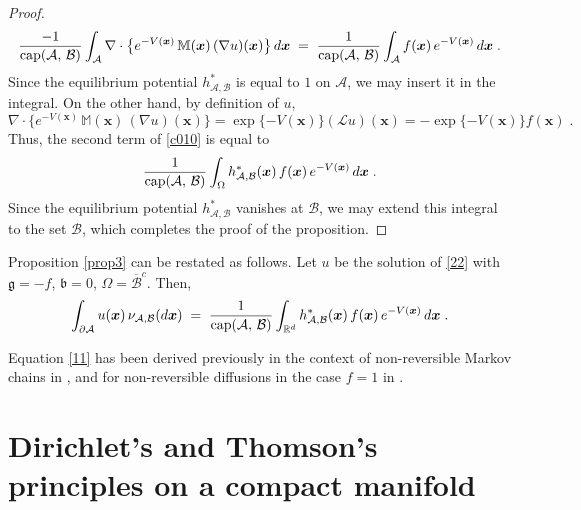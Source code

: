 \documentclass[reqno]{amsart}
\newcounter{as}[section]
\newcommand{\mc}[1]{{\mathcal #1}}
\newcommand{\mf}[1]{{\mathfrak #1}}
\newcommand{\bb}[1]{{\mathbb #1}}
\newcommand{\bs}[1]{{\boldsymbol #1}}
\newcommand{\<}{\langle}
\renewcommand{\>}{\rangle}
\renewcommand{\Cap}{{\rm cap}}
\begin{document}
\begin{proof}
\begin{equation*}
\frac {-1} {\Cap (\mc A,\,\mc B)} \int_{\mc A}
\nabla \cdot \big\{ e^{-V(\bs{x})} \, \bb M(\bs{x}) \, (\nabla u)(\bs{x}) \big\} \,
d\bs{x} \;=\; \frac {1} {\Cap (\mc A,\,\mc B)} \int_{\mc A} f(\bs{x}) \, e^{-V(\bs{x})}\, d\bs{x} \;.
\end{equation*}
Since the equilibrium potential $h^*_{\mc A,\mc B}$ is equal to $1$ on $\mc A$, we
may insert it in the integral.
On the other hand, by definition of $u$,
$$\nabla \cdot \{ e^{-V(\bs{x})} \,
\bb M(\bs{x}) \, (\nabla u)(\bs{x}) \} = \exp\{-V(\bs{x})\} (\mathcal L u)(\bs{x}) = -
\exp\{-V(\bs{x})\} f(\bs{x})\;.$$
Thus, the second term of \eqref{c010} is equal to
\begin{equation*}
\frac {1} {\Cap (\mc A,\,\mc B)} \int_{\Omega} h^*_{\mc A,\mc B} (\bs{x}) \, f(\bs{x}) \,
e^{-V(\bs{x})}\, d\bs{x} \;.
\end{equation*}
Since the equilibrium potential $h^*_{\mc A,\mc B}$ vanishes at $\mc B$, we may
extend this integral to the set $\mc B$, which completes the proof of
the proposition.
\end{proof}

Proposition \ref{prop3} can be restated as follows. Let $u$ be the
solution of \eqref{22} with $\mf g = - f$, $\mf b=0$, $\Omega =
\overline{\mc B}^c$.  Then,
\begin{equation}
\label{2-1}
\int_{\partial \mc A} u(\bs{x})\, \nu_{\mc A,\mc B}(d\bs{x}) \;=\;
\frac {1} {\Cap (\mc A,\,\mc B)}
\int_{\bb R^d} h^*_{\mc A,\mc B} (\bs{x}) \, f(\bs{x}) \, e^{-V(\bs{x})}\, d\bs{x} \;.
\end{equation}

Equation \eqref{11} has been derived previously in the
  context of non-reversible Markov chains in \cite[Proposition~A.2]{BL2}, and for non-reversible diffusions in the case $f=1$ in \cite[Proposition~1.8]{ln}.

\section{Dirichlet's and Thomson's principles on a compact manifold}
\label{sec7}
\end{document}
